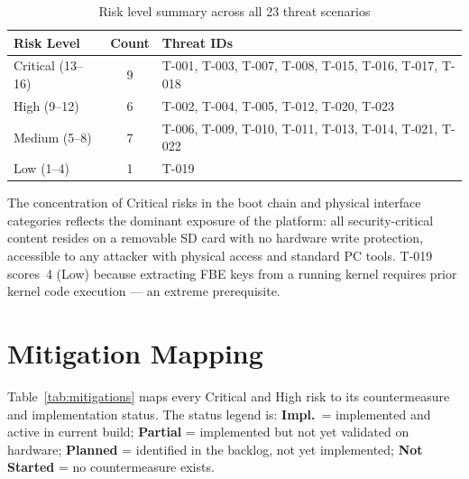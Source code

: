 \begin{table}[h]
\centering
\caption{Risk level summary across all 23 threat scenarios}
\label{tab:risk_summary}
\begin{tabularx}{\textwidth}{l c >{\raggedright\arraybackslash}X}
\toprule
\textbf{Risk Level} & \textbf{Count} & \textbf{Threat IDs} \\
\midrule
Critical (13--16) & 9  & T-001, T-003, T-007, T-008, T-015, T-016, T-017, T-018 \\
High     (9--12)  & 6  & T-002, T-004, T-005, T-012, T-020, T-023 \\
Medium   (5--8)   & 7  & T-006, T-009, T-010, T-011, T-013, T-014, T-021, T-022 \\
Low      (1--4)   & 1  & T-019 \\
\bottomrule
\end{tabularx}
\end{table}

The concentration of Critical risks in the boot chain and physical interface categories reflects the dominant exposure of the platform: all security-critical content resides on a removable SD card with no hardware write protection, accessible to any attacker with physical access and standard PC tools. T-019 scores~4 (Low) because extracting FBE keys from a running kernel requires prior kernel code execution --- an extreme prerequisite.

\section{Mitigation Mapping}
\label{sec:tara_mitigations}

Table~\ref{tab:mitigations} maps every Critical and High risk to its countermeasure and implementation status. The status legend is: \textbf{Impl.}\ = implemented and active in current build; \textbf{Partial} = implemented but not yet validated on hardware;
\textbf{Planned} = identified in the backlog, not yet implemented;
\textbf{Not Started} = no countermeasure exists.

